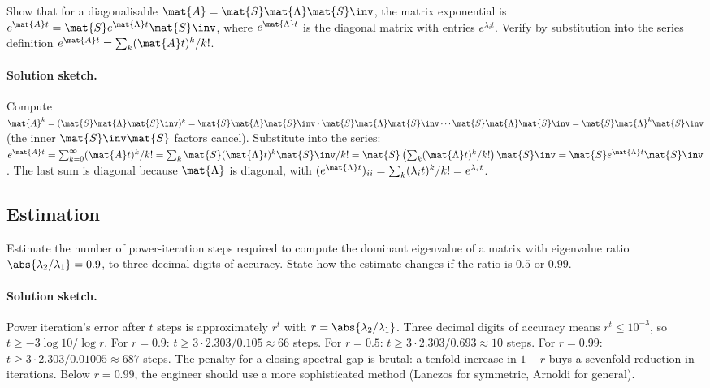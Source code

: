\begin{exercise}
Show that for a diagonalisable $\mat{A} = \mat{S} \mat{\Lambda}
\mat{S}\inv$, the matrix exponential is $e^{\mat{A} t} = \mat{S}
e^{\mat{\Lambda} t} \mat{S}\inv$, where $e^{\mat{\Lambda} t}$ is
the diagonal matrix with entries $e^{\lambda_{i} t}$. Verify by
substitution into the series definition $e^{\mat{A} t} = \sum_{k}
(\mat{A} t)^{k}/k!$.
\end{exercise}

\paragraph{Solution sketch.}
Compute $\mat{A}^{k} = (\mat{S} \mat{\Lambda} \mat{S}\inv)^{k} =
\mat{S} \mat{\Lambda} \mat{S}\inv \cdot \mat{S} \mat{\Lambda}
\mat{S}\inv \cdots \mat{S} \mat{\Lambda} \mat{S}\inv = \mat{S}
\mat{\Lambda}^{k} \mat{S}\inv$ (the inner $\mat{S}\inv \mat{S}$
factors cancel). Substitute into the series: $e^{\mat{A} t} =
\sum_{k=0}^{\infty} (\mat{A} t)^{k}/k! = \sum_{k} \mat{S} (\mat{\Lambda}
t)^{k} \mat{S}\inv / k! = \mat{S} \left(\sum_{k} (\mat{\Lambda} t)^{k}
/ k!\right) \mat{S}\inv = \mat{S} e^{\mat{\Lambda} t} \mat{S}\inv$.
The last sum is diagonal because $\mat{\Lambda}$ is diagonal, with
$(e^{\mat{\Lambda} t})_{ii} = \sum_{k} (\lambda_{i} t)^{k}/k! =
e^{\lambda_{i} t}$.

\subsection*{Estimation}

\begin{exercise}
Estimate the number of power-iteration steps required to compute
the dominant eigenvalue of a matrix with eigenvalue ratio
$\abs{\lambda_{2}/\lambda_{1}} = 0.9$, to three decimal digits of
accuracy. State how the estimate changes if the ratio is $0.5$ or
$0.99$.
\end{exercise}

\paragraph{Solution sketch.}
Power iteration's error after $t$ steps is approximately
$r^{t}$ with $r = \abs{\lambda_{2}/\lambda_{1}}$. Three decimal
digits of accuracy means $r^{t} \leq 10^{-3}$, so $t \geq -3 \log
10 / \log r$. For $r = 0.9$: $t \geq 3 \cdot 2.303 / 0.105 \approx
66$ steps. For $r = 0.5$: $t \geq 3 \cdot 2.303 / 0.693 \approx 10$
steps. For $r = 0.99$: $t \geq 3 \cdot 2.303 / 0.01005 \approx 687$
steps. The penalty for a closing spectral gap is brutal: a tenfold
increase in $1 - r$ buys a sevenfold reduction in iterations. Below
$r = 0.99$, the engineer should use a more sophisticated method
(Lanczos for symmetric, Arnoldi for general).

